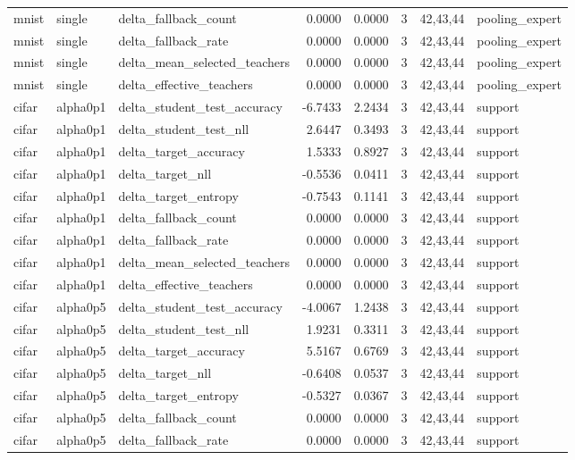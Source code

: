 \begin{tabular}{lllrrrll}
mnist & single & delta\_fallback\_count & 0.0000 & 0.0000 & 3 & 42,43,44 & pooling\_expert \\
mnist & single & delta\_fallback\_rate & 0.0000 & 0.0000 & 3 & 42,43,44 & pooling\_expert \\
mnist & single & delta\_mean\_selected\_teachers & 0.0000 & 0.0000 & 3 & 42,43,44 & pooling\_expert \\
mnist & single & delta\_effective\_teachers & 0.0000 & 0.0000 & 3 & 42,43,44 & pooling\_expert \\
cifar & alpha0p1 & delta\_student\_test\_accuracy & -6.7433 & 2.2434 & 3 & 42,43,44 & support \\
cifar & alpha0p1 & delta\_student\_test\_nll & 2.6447 & 0.3493 & 3 & 42,43,44 & support \\
cifar & alpha0p1 & delta\_target\_accuracy & 1.5333 & 0.8927 & 3 & 42,43,44 & support \\
cifar & alpha0p1 & delta\_target\_nll & -0.5536 & 0.0411 & 3 & 42,43,44 & support \\
cifar & alpha0p1 & delta\_target\_entropy & -0.7543 & 0.1141 & 3 & 42,43,44 & support \\
cifar & alpha0p1 & delta\_fallback\_count & 0.0000 & 0.0000 & 3 & 42,43,44 & support \\
cifar & alpha0p1 & delta\_fallback\_rate & 0.0000 & 0.0000 & 3 & 42,43,44 & support \\
cifar & alpha0p1 & delta\_mean\_selected\_teachers & 0.0000 & 0.0000 & 3 & 42,43,44 & support \\
cifar & alpha0p1 & delta\_effective\_teachers & 0.0000 & 0.0000 & 3 & 42,43,44 & support \\
cifar & alpha0p5 & delta\_student\_test\_accuracy & -4.0067 & 1.2438 & 3 & 42,43,44 & support \\
cifar & alpha0p5 & delta\_student\_test\_nll & 1.9231 & 0.3311 & 3 & 42,43,44 & support \\
cifar & alpha0p5 & delta\_target\_accuracy & 5.5167 & 0.6769 & 3 & 42,43,44 & support \\
cifar & alpha0p5 & delta\_target\_nll & -0.6408 & 0.0537 & 3 & 42,43,44 & support \\
cifar & alpha0p5 & delta\_target\_entropy & -0.5327 & 0.0367 & 3 & 42,43,44 & support \\
cifar & alpha0p5 & delta\_fallback\_count & 0.0000 & 0.0000 & 3 & 42,43,44 & support \\
cifar & alpha0p5 & delta\_fallback\_rate & 0.0000 & 0.0000 & 3 & 42,43,44 & support \\

\end{tabular}
